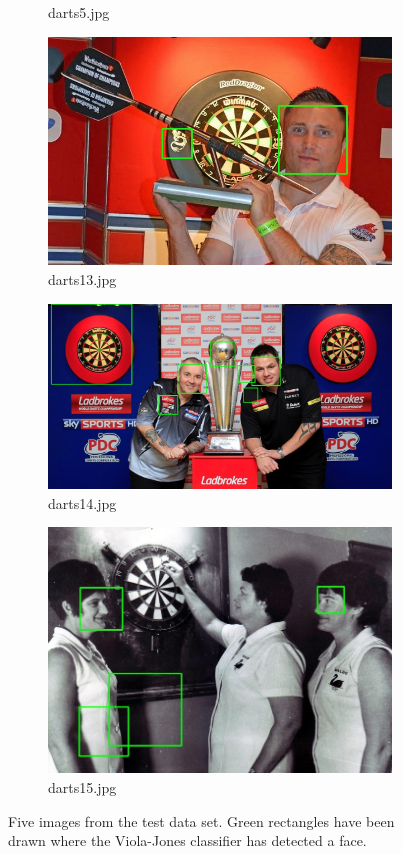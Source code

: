 \documentclass[conference]{IEEEtran}
\begin{document}
\begin{figure}[htb]
\begin{subfigure}{.5\linewidth}
  \caption{darts5.jpg}
  \label{fig:sub2}
\end{subfigure}
\begin{subfigure}{.5\linewidth}
  \centering
  \includegraphics[width=.9\linewidth]{images/detected2.jpg}
  \caption{darts13.jpg}
  \label{fig:sub1}
\end{subfigure}%
\begin{subfigure}{.5\linewidth}
  \centering
  \includegraphics[width=.9\linewidth]{images/detected3.jpg}
  \caption{darts14.jpg}
  \label{fig:sub2}
\end{subfigure}
\begin{subfigure}{.5\linewidth}
\centering
\includegraphics[width=0.9\linewidth]{images/detected4.jpg}
\caption{darts15.jpg}
\end{subfigure}


\caption{Five images from the test data set. Green rectangles have been drawn where the Viola-Jones classifier has detected a face. }
\label{fig:q13}
\end{figure}
\end{document}
